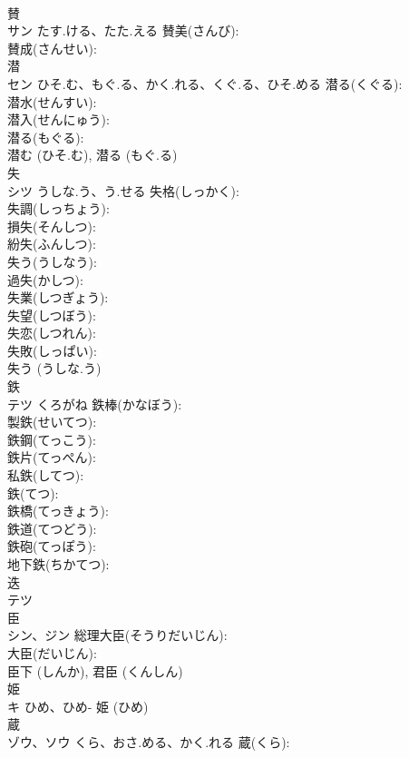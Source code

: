 \documentclass[8pt]{extreport}
\begin{document}
\begin{CJK}{UTF8}{min}
\\	賛			
\\	サン	たす.ける、たた.える	賛美(さんび): 
\\	賛成(さんせい): 
\\	潜			
\\	セン	ひそ.む、もぐ.る、かく.れる、くぐ.る、ひそ.める	潜る(くぐる): 
\\	潜水(せんすい): 
\\	潜入(せんにゅう): 
\\	潜る(もぐる): 
\\	潜む (ひそ.む), 潜る (もぐ.る)
\\	失			
\\	シツ	うしな.う、う.せる	失格(しっかく): 
\\	失調(しっちょう): 
\\	損失(そんしつ): 
\\	紛失(ふんしつ): 
\\	失う(うしなう): 
\\	過失(かしつ): 
\\	失業(しつぎょう): 
\\	失望(しつぼう): 
\\	失恋(しつれん): 
\\	失敗(しっぱい): 
\\	失う (うしな.う)
\\	鉄			
\\	テツ	くろがね	鉄棒(かなぼう): 
\\	製鉄(せいてつ): 
\\	鉄鋼(てっこう): 
\\	鉄片(てっぺん): 
\\	私鉄(してつ): 
\\	鉄(てつ): 
\\	鉄橋(てっきょう): 
\\	鉄道(てつどう): 
\\	鉄砲(てっぽう): 
\\	地下鉄(ちかてつ): 
\\	迭			
\\	テツ			
\\	臣			
\\	シン、ジン		総理大臣(そうりだいじん): 
\\	大臣(だいじん): 
\\	臣下 (しんか), 君臣 (くんしん)
\\	姫			
\\	キ	ひめ、ひめ-		姫 (ひめ)
\\	蔵			
\\	ゾウ、ソウ	くら、おさ.める、かく.れる	蔵(くら): 

\end{CJK}
\end{document}
